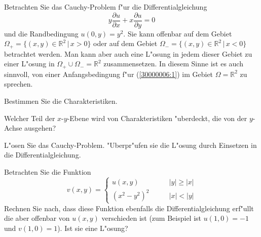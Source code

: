 Betrachten Sie das Cauchy-Problem f"ur die Differentialgleichung
\begin{equation}
y\frac{\partial u}{\partial x}+x\frac{\partial u}{\partial y}=0
\label{30000006:1}
\end{equation}
und die Randbedingung $u(0,y)=y^2$.
Sie kann offenbar auf dem Gebiet $\Omega_+=\{ (x,y)\in\mathbb R^2\,|\, x > 0\}$
oder auf dem Gebiet $\Omega_-=\{(x,y)\in\mathbb R^2\,|\, x <0\}$ betrachtet
werden. Man kann aber auch eine L"osung in jedem dieser Gebiet zu einer
L"osung in $\Omega_+\cup\Omega_-=\mathbb R^2$ zusammensetzen. In diesem
Sinne ist es auch sinnvoll, von einer Anfangsbedingung f"ur
(\ref{30000006:1}) im Gebiet $\Omega=\mathbb R^2$ zu sprechen.
\begin{teilaufgaben}
\item Bestimmen Sie die Charakteristiken.
\item Welcher Teil der $x$-$y$-Ebene wird von Charakteristiken "uberdeckt,
die von der $y$-Achse ausgehen?
\item L"osen Sie das Cauchy-Problem. "Uberpr"ufen sie die L"osung durch
Einsetzen in die Differentialgleichung.
\item Betrachten Sie die Funktion
\[
v(x,y)=\begin{cases}
u(x,y)&\qquad |y|\ge |x|\\
(x^2-y^2)^2&\qquad |x|<|y|
\end{cases}
\]
Rechnen Sie nach, dass diese Funktion ebenfalls die Differentialgleichung
erf"ullt
die aber offenbar von $u(x,y)$ verschieden ist (zum Beispiel ist
$u(1,0)=-1$ und $v(1,0)=1$). Ist sie eine L"osung?
\end{teilaufgaben}

